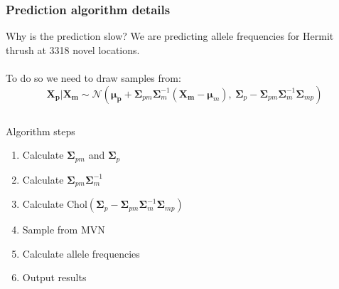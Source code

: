 \documentclass[slidestop,mathserif]{beamer}
\begin{document}

\begin{frame}
\frametitle{Prediction algorithm details}

Why is the prediction slow? \pause We are predicting allele frequencies for Hermit thrush at 3318 novel locations.\\
~\\
To do so we need to draw samples from:
\[ \bm{X_p} | \bm{X_m} \sim \mathcal{N}(\bm{\mu_p}+\bm\Sigma_{pm}\bm\Sigma_{m}^{-1}(\bm{X_m}-\bm\mu_m),~ \bm\Sigma_{p}-\bm\Sigma_{pm}\bm\Sigma_{m}^{-1}\bm\Sigma_{mp}) \]

\pause

\vspace{-7mm}

\begin{columns}
\begin{block}{Algorithm steps}
\begin{enumerate}
\item Calculate $\bm\Sigma_{pm}$ and $\bm\Sigma_{p}$
\item Calculate $\bm\Sigma_{pm} \bm\Sigma_{m}^{-1}$
\item Calculate $\text{Chol}(\bm\Sigma_{p}-\bm\Sigma_{pm}\bm\Sigma_{m}^{-1}\bm\Sigma_{mp})$
\item Sample from MVN
\item Calculate allele frequencies
\item Output results
\end{enumerate}
\end{block}
\end{columns}
\end{frame}

\end{document}
